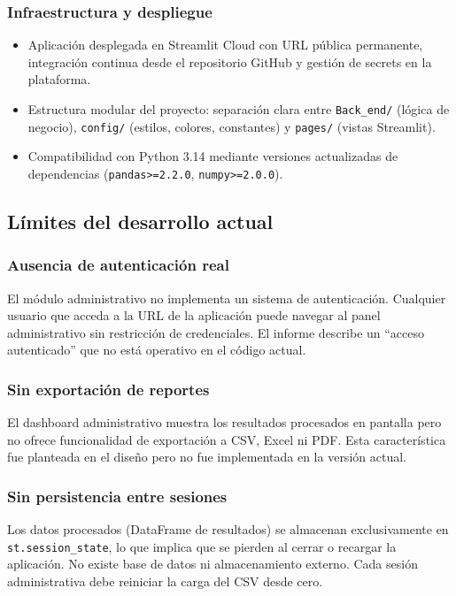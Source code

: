 \documentclass[12pt, spanish]{article}
\begin{document}
\subsubsection{Infraestructura y despliegue}
\begin{itemize}
    \item Aplicación desplegada en Streamlit Cloud con URL pública permanente, integración continua desde el repositorio GitHub y gestión de secrets en la plataforma.
    \item Estructura modular del proyecto: separación clara entre \texttt{Back\_end/} (lógica de negocio), \texttt{config/} (estilos, colores, constantes) y \texttt{pages/} (vistas Streamlit).
    \item Compatibilidad con Python 3.14 mediante versiones actualizadas de dependencias (\texttt{pandas>=2.2.0}, \texttt{numpy>=2.0.0}).
\end{itemize}

\subsection{Límites del desarrollo actual}

\subsubsection{Ausencia de autenticación real}
El módulo administrativo no implementa un sistema de autenticación. Cualquier usuario que acceda a la URL de la aplicación puede navegar al panel administrativo sin restricción de credenciales. El informe describe un ``acceso autenticado'' que no está operativo en el código actual.

\subsubsection{Sin exportación de reportes}
El dashboard administrativo muestra los resultados procesados en pantalla pero no ofrece funcionalidad de exportación a CSV, Excel ni PDF. Esta característica fue planteada en el diseño pero no fue implementada en la versión actual.

\subsubsection{Sin persistencia entre sesiones}
Los datos procesados (DataFrame de resultados) se almacenan exclusivamente en \texttt{st.session\_state}, lo que implica que se pierden al cerrar o recargar la aplicación. No existe base de datos ni almacenamiento externo. Cada sesión administrativa debe reiniciar la carga del CSV desde cero.
\end{document}
